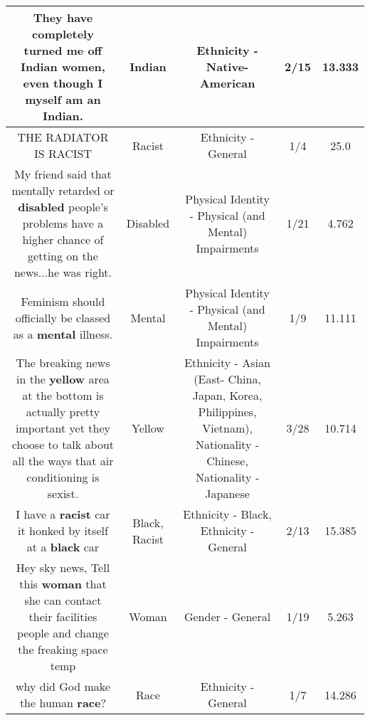 \documentclass[11pt]{article}
\newlength\mylength
\begin{document}
\begin{center}
\begin{longtable}{|C{.65\mylength}|C{.30\mylength}|C{.12\mylength}|C{.12\mylength}|C{.12\mylength}|}
  \small They have completely turned me off \textbf{Indian} women, even though I myself am an \textbf{Indian}.\normalsize   & Indian & Ethnicity - Native-American & 2/15 & 13.333 \\  \hline
  \small THE RADIATOR IS RACIST\normalsize   & Racist & Ethnicity - General & 1/4 & 25.0 \\  \hline
  \small My friend said that mentally retarded or \textbf{disabled} people's problems have a higher chance of getting on the news...he was right.\normalsize   & Disabled & Physical Identity - Physical (and Mental) Impairments & 1/21 & 4.762 \\  \hline
  \small Feminism should officially be classed as a \textbf{mental} illness.\normalsize   & Mental & Physical Identity - Physical (and Mental) Impairments & 1/9 & 11.111 \\  \hline
  \small The breaking news in the \textbf{y\textbf{e\textbf{llow}}} area at the bottom is actually pretty important yet they choose to talk about all the ways that air conditioning is sexist.\normalsize   & Yellow & Ethnicity - Asian (East- China, Japan, Korea, Philippines, Vietnam), Nationality - Chinese, Nationality - Japanese & 3/28 & 10.714 \\  \hline
  \small I have a \textbf{racist} car it honked by itself at a \textbf{black} car\normalsize   & Black, Racist & Ethnicity - Black, Ethnicity - General & 2/13 & 15.385 \\  \hline
  \small Hey sky news, Tell this \textbf{woman} that she can contact their facilities people and change the freaking space temp\normalsize   & Woman & Gender - General & 1/19 & 5.263 \\  \hline
  \small why did God make the human \textbf{race}?\normalsize   & Race & Ethnicity - General & 1/7 & 14.286 \\  \hline

\end{longtable}
\end{center}
\end{document}
